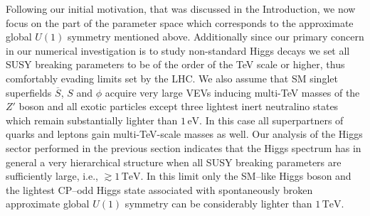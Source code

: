 \documentclass[12pt,a4paper]{article}
\begin{document}
Following our initial motivation, that was discussed in the Introduction, 
we now focus on the part of the parameter
space which corresponds to the approximate global $U(1)$ symmetry mentioned above. Additionally since our primary concern in our numerical investigation is to study non-standard Higgs decays we set all SUSY breaking parameters to be of the order of the TeV scale or higher, thus comfortably evading limits set by the LHC.
We also assume that SM singlet superfields $\overline{S}$, $S$ and $\phi$ acquire very large VEVs
inducing multi-TeV masses of the $Z'$ boson and all exotic particles except three
 lightest inert neutralino states which
remain substantially lighter than $1\,\mbox{eV}$. In this case all superpartners of
 quarks and leptons gain multi-TeV-scale masses as well. Our analysis of the Higgs sector performed in the previous section indicates that the
Higgs spectrum has in general a very hierarchical structure when all SUSY breaking parameters are sufficiently
large, i.e., $\gtrsim 1\,\mbox{TeV}$. In this limit only the SM--like Higgs boson 
and the lightest CP--odd Higgs state 
associated with spontaneously broken approximate global $U(1)$ symmetry can be considerably lighter than
$1\,\mbox{TeV}$.
\end{document}
